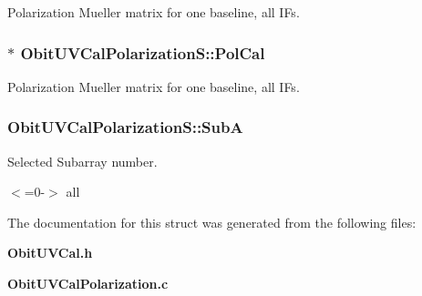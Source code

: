 Polarization Mueller matrix for one baseline, all IFs. 

\subsubsection{$\ast$ {\bf Obit\-UVCal\-Polarization\-S::Pol\-Cal}}\label{structObitUVCalPolarizationS_o19}


Polarization Mueller matrix for one baseline, all IFs. 

\subsubsection{ {\bf Obit\-UVCal\-Polarization\-S::Sub\-A}}\label{structObitUVCalPolarizationS_o3}


Selected Subarray number. 

$<$=0-$>$ all 

The documentation for this struct was generated from the following files:\begin{CompactItemize}
\item 
{\bf Obit\-UVCal.h}\item 
{\bf Obit\-UVCal\-Polarization.c}\end{CompactItemize}
